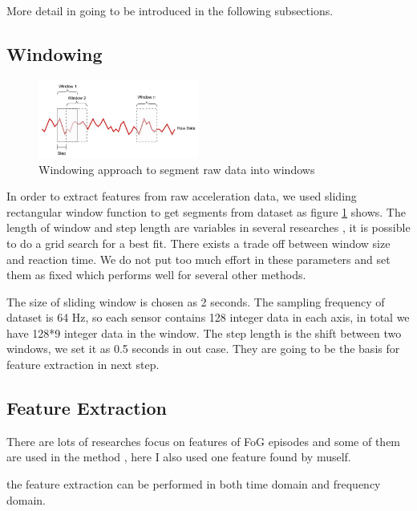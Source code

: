 \documentclass[article]{article}
\begin{document}
More detail in going to be introduced in the following subsections.


\subsection{Windowing}
    \begin{figure}
	\centering
	\includegraphics[width=0.47\textwidth]{windowing}
	\caption{Windowing approach to segment raw data into windows }
	\label{fig:windowing}
	
	\end{figure}
In order to extract features from raw acceleration data, we used sliding rectangular window function to get segments from dataset as figure \ref{fig:windowing} shows. The length of window and step length are variables in several researches \cite{Flo}\cite{ML}, it is possible to do a grid search for a best fit. There exists a trade off between window size and reaction time. We do not put too much effort in these parameters and set them as fixed which performs well for several other methods.

The size of sliding window is chosen as 2 seconds. The sampling frequency of dataset is 64 Hz, so each sensor contains 128 integer data in each axis, in total we have 128*9 integer data in the window. The step length is the shift between two windows, we set it as 0.5 seconds in out case. They are going to be the basis for feature extraction in next step.  


\subsection{Feature Extraction}

There are lots of researches focus on features of FoG episodes and some of them are used in the method \cite{FI}\cite{FI1}\cite{WM}\cite{sammpleE}, here I also used one feature found by muself.

the feature extraction can be performed in both time domain and frequency domain. 
\end{document}

